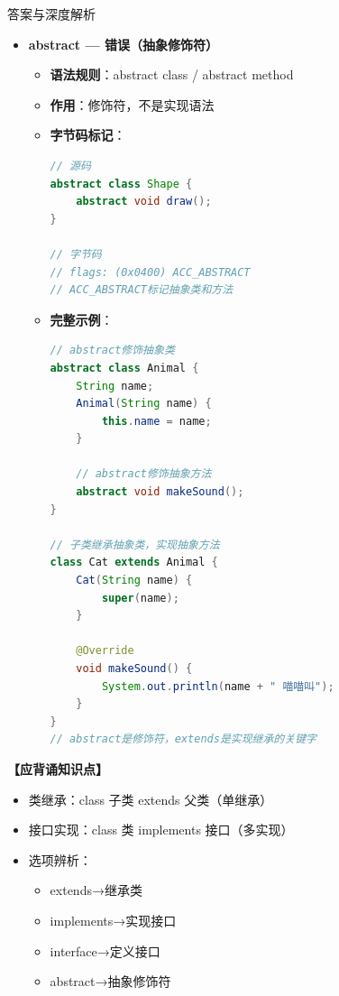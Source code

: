 \documentclass[12pt, a4paper]{ctexart}
\begin{document}
\begin{enumerate}[label=\textbf{\arabic*.}]
\begin{bluebox}{答案与深度解析}
\begin{itemize}[leftmargin=*, nosep, label={}]
\begin{itemize}[label={}, leftmargin=*, nosep]
\begin{lstlisting}[language=Java]
// 实现接口（不是继承）
class MyClass implements Cloneable {
    public void clone() {}
}
				      \end{lstlisting}
			            \end{itemize}

			      \item[D] \textbf{abstract — 错误（抽象修饰符）}
			            \begin{itemize}[label={}, leftmargin=*, nosep]
				            \item \textbf{语法规则}：abstract class / abstract method
				            \item \textbf{作用}：修饰符，不是实现语法
				            \item \textbf{字节码标记}：
				                  \begin{lstlisting}[language=Java]
// 源码
abstract class Shape {
    abstract void draw();
}

// 字节码
// flags: (0x0400) ACC_ABSTRACT
// ACC_ABSTRACT标记抽象类和方法
				      \end{lstlisting}
				            \item \textbf{完整示例}：
				                  \begin{lstlisting}[language=Java]
// abstract修饰抽象类
abstract class Animal {
    String name;
    Animal(String name) {
        this.name = name;
    }

    // abstract修饰抽象方法
    abstract void makeSound();
}

// 子类继承抽象类，实现抽象方法
class Cat extends Animal {
    Cat(String name) {
        super(name);
    }

    @Override
    void makeSound() {
        System.out.println(name + " 喵喵叫");
    }
}
// abstract是修饰符，extends是实现继承的关键字
				      \end{lstlisting}
			            \end{itemize}
		      \end{itemize}

		      \textbf{【应背诵知识点】}
		      \begin{itemize}[label={}, nosep]
			      \item 类继承：class 子类 extends 父类（单继承）
			      \item 接口实现：class 类 implements 接口（多实现）
			      \item 选项辨析：
			            \begin{itemize}[label={}, nosep]
				            \item extends→继承类
				            \item implements→实现接口
				            \item interface→定义接口
				            \item abstract→抽象修饰符
			            \end{itemize}
		      \end{itemize}


\end{bluebox}
\end{enumerate}
\end{document}

